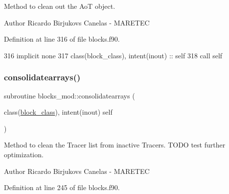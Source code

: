 Method to clean out the AoT object. 

\begin{DoxyAuthor}{Author}
Ricardo Birjukovs Canelas -\/ M\+A\+R\+E\+T\+EC 
\end{DoxyAuthor}


Definition at line 316 of file blocks.\+f90.


\begin{DoxyCode}
316     \textcolor{keywordtype}{implicit none}
317     \textcolor{keywordtype}{class}(block\_class), \textcolor{keywordtype}{intent(inout)} :: self    
318     \textcolor{keyword}{call }self%
\end{DoxyCode}
\mbox{\label{namespaceblocks__mod_a25ff530b5125e4cee5b1f474b2491883}} 
\subsubsection{\texorpdfstring{consolidatearrays()}{consolidatearrays()}}
{\footnotesize\ttfamily subroutine blocks\+\_\+mod\+::consolidatearrays (\begin{DoxyParamCaption}\item[{class(\mbox{\hyperlink{structblocks__mod_1_1block__class}{block\+\_\+class}}), intent(inout)}]{self }\end{DoxyParamCaption})\hspace{0.3cm}{\ttfamily [private]}}



Method to clean the Tracer list from inactive Tracers. T\+O\+DO test further optimization. 

\begin{DoxyAuthor}{Author}
Ricardo Birjukovs Canelas -\/ M\+A\+R\+E\+T\+EC 
\end{DoxyAuthor}


Definition at line 245 of file blocks.\+f90.



